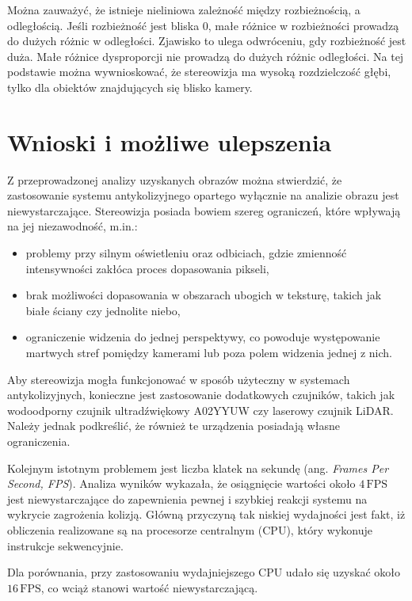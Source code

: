 \documentclass[magisterska]{pracadypl}
\begin{document}
Można zauważyć, że istnieje nieliniowa zależność między rozbieżnością, a odległością.
Jeśli rozbieżność jest bliska 0, małe różnice w rozbieżności prowadzą do dużych różnic w odległości.
Zjawisko to ulega odwróceniu, gdy rozbieżność jest duża. Małe różnice dysproporcji nie prowadzą do dużych różnic odległości. Na tej podstawie można wywnioskować, że stereowizja ma wysoką rozdzielczość głębi, tylko dla obiektów znajdujących się blisko kamery.

\chapter{Wnioski i możliwe ulepszenia}

Z przeprowadzonej analizy uzyskanych obrazów można stwierdzić, że zastosowanie systemu antykolizyjnego opartego wyłącznie na analizie obrazu jest niewystarczające. 
Stereowizja posiada bowiem szereg ograniczeń, które wpływają na jej niezawodność, m.in.: 

\begin{itemize}
    \item problemy przy silnym oświetleniu oraz odbiciach, gdzie zmienność intensywności zakłóca proces dopasowania pikseli,
    \item brak możliwości dopasowania w obszarach ubogich w teksturę, takich jak białe ściany czy jednolite niebo,
    \item ograniczenie widzenia do jednej perspektywy, co powoduje występowanie martwych stref pomiędzy kamerami lub poza polem widzenia jednej z nich.
\end{itemize}

Aby stereowizja mogła funkcjonować w sposób użyteczny w systemach antykolizyjnych, konieczne jest zastosowanie dodatkowych czujników, takich jak wodoodporny czujnik ultradźwiękowy A02YYUW czy laserowy czujnik LiDAR. Należy jednak podkreślić, że również te urządzenia posiadają własne ograniczenia.

Kolejnym istotnym problemem jest liczba klatek na sekundę (ang. \textit{Frames Per Second, FPS}). Analiza wyników wykazała, że osiągnięcie wartości około $4\,\text{FPS}$ jest niewystarczające do zapewnienia pewnej i szybkiej reakcji systemu na wykrycie zagrożenia kolizją. Główną przyczyną tak niskiej wydajności jest fakt, iż obliczenia realizowane są na procesorze centralnym (CPU), który wykonuje instrukcje sekwencyjnie.

Dla porównania, przy zastosowaniu wydajniejszego CPU udało się uzyskać około $16\,\text{FPS}$, co wciąż stanowi wartość niewystarczającą.
\end{document}

